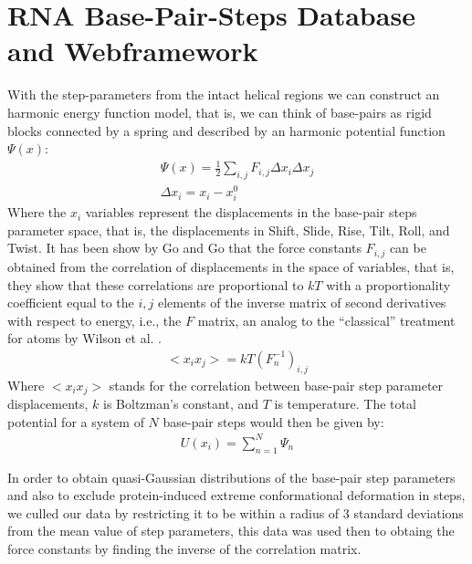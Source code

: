 


\section{RNA Base-Pair-Steps Database and Webframework}
With the step-parameters from the intact helical regions we can
construct an harmonic energy function model, that is, we can think of
base-pairs  as  rigid  blocks  connected  by a spring  and
described by an harmonic potential function $\Psi(x)$:
\begin{gather}
\Psi (x) = \frac{1}{2}\sum_{i,j} F_{i,j} \Delta x_{i} \Delta x_{j}\\
\Delta x_{i}=x_{i}-x_{i}^{0}
\end{gather}  
Where  the  $x_{i}$  variables  represent  the  displacements  in  the
base-pair steps parameter space,  that is, the displacements in Shift,
Slide, Rise,  Tilt, Roll,  and Twist. It  has been  show by Go  and Go
\cite{go1976} that the force  constants $F_{i,j}$ can be obtained from
the correlation of  displacements in the space of  variables, that is,
they show that these correlations are proportional to $kT$ with a
proportionality coefficient equal to the $i,j$ elements of the inverse
matrix of  second derivatives  with respect to  energy, i.e.,   the $F$
matrix, an analog to the ``classical'' treatment for atoms by Wilson et
al. \cite{wilson1955}.
\begin{gather}
<x_i x_j> = kT (F_{n}^{-1})_{i,j}
\end{gather}
Where $<x_i  x_j>$ stands for  the correlation between  base-pair step
parameter  displacements,  $k$  is  Boltzman's constant,  and  $T$  is
temperature. The total potential for a system of $N$ base-pair steps would
then be given by:
\begin{gather}
U(x_{i}) = \sum_{n=1}^{N} \Psi_{n}
\end{gather}

In order to obtain  quasi-Gaussian distributions of the base-pair step
parameters and also to  exclude protein-induced extreme conformational
deformation  in steps,  we culled  our data  by restricting  it  to be
within a radius  of 3 standard deviations from the  mean value of step
parameters, this data was used then to obtaing the force constants
by finding the inverse of the correlation matrix.

